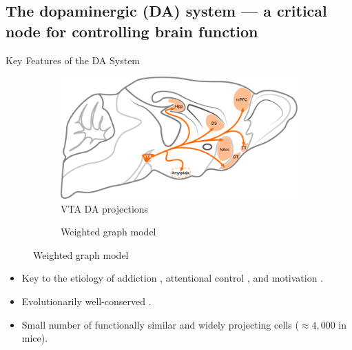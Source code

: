 		\subsection{The dopaminergic (DA) system — a critical node for controlling brain function}
			\begin{frame}{Key Features of the DA System}
				\begin{figure}
					\begin{subfigure}{.46\textwidth}
						\vspace{-.5em}
						\centering
						\includegraphics[width=\textwidth]{img/model_literature}
						\vspace{-2em}
						\caption{VTA DA projections}
					\end{subfigure}
					\begin{subfigure}{.53\textwidth}
						\vspace{-2.75em}
						\centering
						\vspace{-2.5em}
						\caption{Weighted graph model}
					\end{subfigure}
					\vspace{-.75em}
				\end{figure}
				\begin{itemize}
					\item Key to the etiology of addiction \cite{DiChiara1999}, attentional control \cite{Nieoullon2002}, and motivation \cite{Salamone1994}.
					\item Evolutionarily well-conserved \cite{Yamamoto2011}.
					\item Small number of functionally similar and widely projecting cells ($\approx4,000$ in mice).
				\end{itemize}
			\end{frame}
